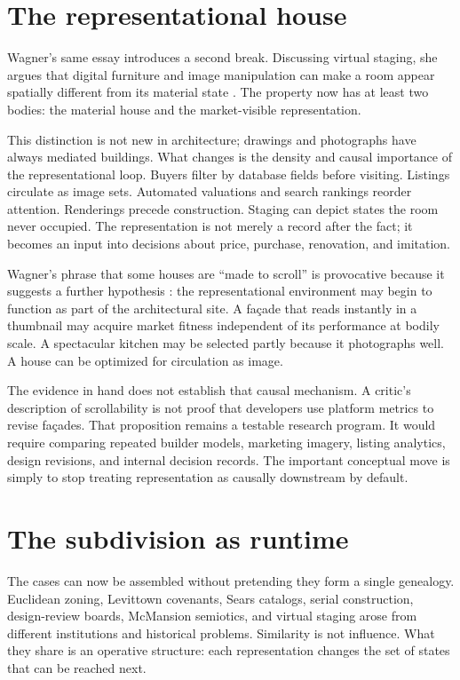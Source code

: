 \documentclass[11pt]{article}
\begin{document}
\section{The representational house}
Wagner's same essay introduces a second break. Discussing virtual staging, she argues that digital furniture and image manipulation can make a room appear spatially different from its material state \citep{wagner2026mcmodernslopcoreRepresentation}. The property now has at least two bodies: the material house and the market-visible representation.

This distinction is not new in architecture; drawings and photographs have always mediated buildings. What changes is the density and causal importance of the representational loop. Buyers filter by database fields before visiting. Listings circulate as image sets. Automated valuations and search rankings reorder attention. Renderings precede construction. Staging can depict states the room never occupied. The representation is not merely a record after the fact; it becomes an input into decisions about price, purchase, renovation, and imitation.

Wagner's phrase that some houses are ``made to scroll'' is provocative because it suggests a further hypothesis \citep{wagner2026scroll}: the representational environment may begin to function as part of the architectural site. A façade that reads instantly in a thumbnail may acquire market fitness independent of its performance at bodily scale. A spectacular kitchen may be selected partly because it photographs well. A house can be optimized for circulation as image.

The evidence in hand does not establish that causal mechanism. A critic's description of scrollability is not proof that developers use platform metrics to revise façades. That proposition remains a testable research program. It would require comparing repeated builder models, marketing imagery, listing analytics, design revisions, and internal decision records. The important conceptual move is simply to stop treating representation as causally downstream by default.

\section{The subdivision as runtime}
The cases can now be assembled without pretending they form a single genealogy. Euclidean zoning, Levittown covenants, Sears catalogs, serial construction, design-review boards, McMansion semiotics, and virtual staging arose from different institutions and historical problems. Similarity is not influence. What they share is an operative structure: each representation changes the set of states that can be reached next.
\end{document}
